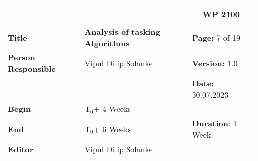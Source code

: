 \begin{table}[!h]
  \begin{center}
    \begin{tabular}{|p{35mm}||p{55mm}|p{50mm}||p{40mm}|}
      \hline
      \multicolumn{3}{|l||}{\textbf{}} & \multicolumn{1}{c|}{}                                                                                                                                                \\
      \multicolumn{3}{|l||}{\textbf{}} & \multicolumn{1}{c|}{\textbf{WP 2100}}                                                                                                                                \\
      \multicolumn{3}{|l||}{\textbf{}} & \multicolumn{1}{c|}{}                                                                                                                                                \\
      \hline\hline
      \textbf{Title}                   & \multicolumn{2}{p{7cm}||}{\textbf{Analysis of tasking Algorithms}}
                                       & \textbf{Page:} 7 of 19                                                                                                                                             \\
      \hline
      \textbf{Person Responsible}        & \multicolumn{2}{l||}{Vipul Dilip Solanke}                                                                                                   & \textbf{Version:} 1.0   \\
      \hline
      \multicolumn{3}{|l||}{}          & \textbf{Date:} 30.07.2023                                                                                                                                          \\
      \hline\hline
      \textbf{Begin}                  & \multicolumn{2}{l||}{T$_0$+ 4 Weeks}                                                                                                                &                         \\
      \hline
      \textbf{End}                    & \multicolumn{2}{l||}{T$_0$+ 6 Weeks}                                                                                                        & \textbf{Duration}: 1 Week \\
      \hline\hline
      \textbf{Editor}              & \multicolumn{3}{l|}{Vipul Dilip Solanke}                                                                                                                              \\

\end{tabular}
\end{center}
\end{table}

